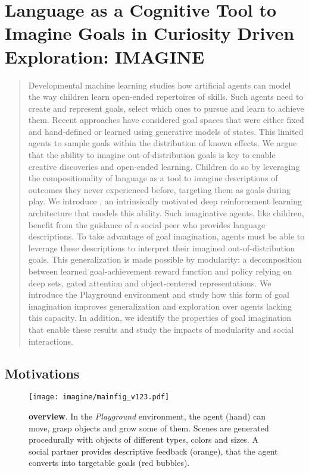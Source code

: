 \chapter{Language as a Cognitive Tool to Imagine Goals in Curiosity Driven Exploration: IMAGINE}

\begin{abstract}
Developmental machine learning studies how artificial agents can model the way children learn open-ended repertoires of skills. Such agents need to create and represent goals, select which ones to pursue and learn to achieve them. Recent approaches have considered goal spaces that were either fixed and hand-defined or learned using generative models of states. This limited agents to sample goals within the distribution of known effects. We argue that the ability to imagine out-of-distribution goals is key to enable creative discoveries and open-ended learning. Children do so by leveraging the compositionality of language as a tool to imagine descriptions of outcomes they never experienced before, targeting them as goals during play. We introduce \imagine, an intrinsically motivated deep reinforcement learning architecture that models this ability. Such imaginative agents, like children, benefit from the guidance of a social peer who provides language descriptions. To take advantage of goal imagination, agents must be able to leverage these descriptions to interpret their imagined out-of-distribution goals. This generalization is made possible by modularity: a decomposition between learned goal-achievement reward function and policy relying on deep sets, gated attention and object-centered representations. We introduce the Playground environment and study how this form of goal imagination improves generalization and exploration over agents lacking this capacity. In addition, we identify the properties of goal imagination that enable these results and study the impacts of modularity and social interactions.
\end{abstract}

\section{Motivations}

\begin{figure}[ht!]
  \centering
    \texttt{[image: imagine/mainfig\_v123.pdf]}
  \caption{\textbf{\imagine overview}. In the \textit{Playground} environment, the agent (hand) can move, grasp objects and grow some of them.
  Scenes are generated procedurally with objects of different types, colors and sizes. A social partner provides descriptive feedback (orange), that the agent converts into targetable goals (red bubbles). \label{fig:main}
}
  \vspace{-.5cm}
\end{figure} 


